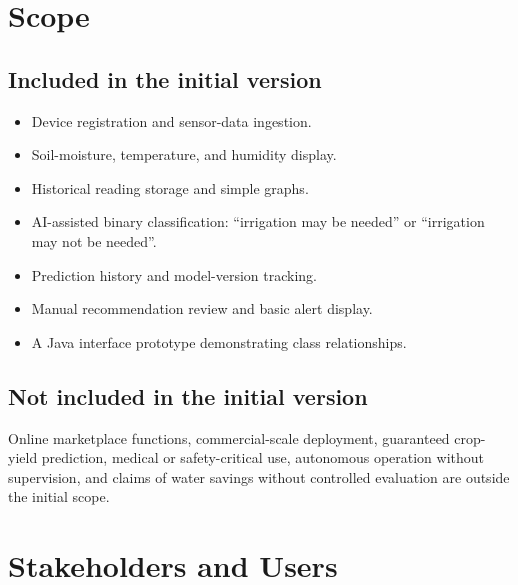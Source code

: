 \documentclass[12pt,a4paper]{report}
\begin{document}
\section{Scope}

\subsection{Included in the initial version}

\begin{itemize}[leftmargin=*]

\item Device registration and sensor-data ingestion.

\item Soil-moisture, temperature, and humidity display.

\item Historical reading storage and simple graphs.

\item AI-assisted binary classification: \textquotedblleft irrigation may be needed\textquotedblright{} or \textquotedblleft irrigation may not be needed\textquotedblright{}.

\item Prediction history and model-version tracking.

\item Manual recommendation review and basic alert display.

\item A Java interface prototype demonstrating class relationships.

\end{itemize}

\subsection{Not included in the initial version}

Online marketplace functions, commercial-scale deployment, guaranteed crop-yield prediction, medical or safety-critical use, autonomous operation without supervision, and claims of water savings without controlled evaluation are outside the initial scope.

\section{Stakeholders and Users}
\end{document}

